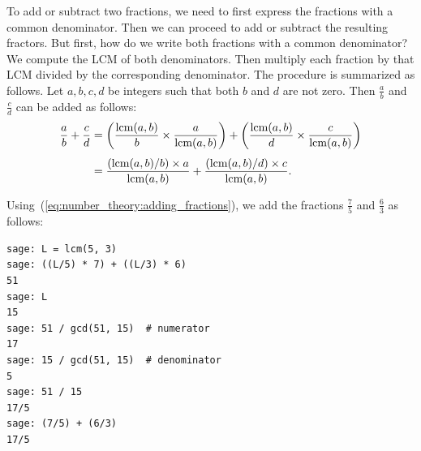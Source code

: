 To add or subtract two fractions, we need to first express the
fractions with a common denominator. Then we can proceed to add or
subtract the resulting fractors. But first, how do we write both
fractions with a common denominator? We compute the LCM of both
denominators. Then multiply each fraction by that LCM divided by the
corresponding denominator. The procedure is summarized as follows. Let
$a,b,c,d$ be integers such that both $b$ and $d$ are not zero. Then
$\frac{a}{b}$ and $\frac{c}{d}$ can be added as follows:
%
\begin{equation}
\label{eq:number_theory:adding_fractions}
\begin{aligned}
\frac{a}{b} + \frac{c}{d}
&=
\left( \frac{\operatorname*{\text{lcm}}(a,b)}{b} \times \frac{a}{\operatorname*{\text{lcm}}(a,b)} \right)
+
\left( \frac{\operatorname*{\text{lcm}}(a,b)}{d} \times \frac{c}{\operatorname*{\text{lcm}}(a,b)} \right) \\[4pt]
&=
\frac{(\operatorname*{\text{lcm}}(a,b) / b) \times a} {\operatorname*{\text{lcm}}(a,b)}
+
\frac{(\operatorname*{\text{lcm}}(a,b) / d) \times c} {\operatorname*{\text{lcm}}(a,b)}.
\end{aligned}
\end{equation}

Using~(\ref{eq:number_theory:adding_fractions}), we add the fractions
$\frac{7}{5}$ and $\frac{6}{3}$ as follows:

\begin{lstlisting}
sage: L = lcm(5, 3)
sage: ((L/5) * 7) + ((L/3) * 6)
51
sage: L
15
sage: 51 / gcd(51, 15)  # numerator
17
sage: 15 / gcd(51, 15)  # denominator
5
sage: 51 / 15
17/5
sage: (7/5) + (6/3)
17/5
\end{lstlisting}
